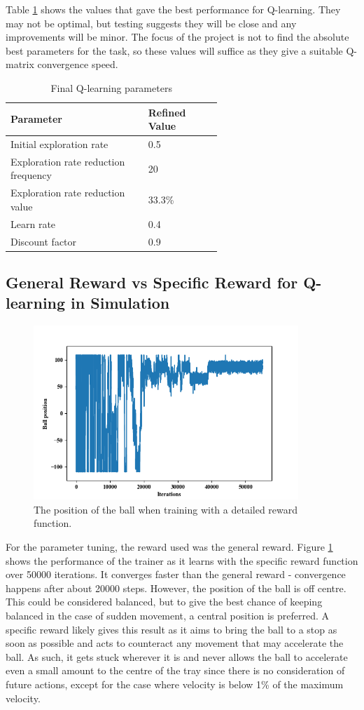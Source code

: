 \documentclass[12pt,a4paper]{article}
\begin{document}
Table \ref{q_params} shows the values that gave the best performance for Q-learning. They may not be optimal, but testing suggests they will be close and any improvements will be minor. The focus of the project is not to find the absolute best parameters for the task, so these values will suffice as they give a suitable Q-matrix convergence speed.
\begin{table}[htb]
\centering
\caption{Final Q-learning parameters}

\label{q_params}
\begin{tabular}{>{\raggedright}p{0.4\linewidth}p{0.2\linewidth}}\hline
Parameter & Refined Value\\ \hline\hline
Initial exploration rate & 0.5\\ \hline
Exploration rate reduction frequency & 20\\ \hline
Exploration rate reduction value & 33.3\% \\\hline
Learn rate & 0.4 \\\hline
Discount factor & 0.9 \\\hline
\end{tabular}
\end{table}


\subsection{General Reward vs Specific Reward for Q-learning in Simulation}
\begin{figure}[H]
	\centering
	\includegraphics[width=10cm]{157}
	\caption{The position of the ball when training with a detailed reward function.}
	\label{f5}
\end{figure}
For the parameter tuning, the reward used was the general reward. Figure \ref{f5} shows the performance of the trainer as it learns with the specific reward function over 50000 iterations. It converges faster than the general reward - convergence happens after about 20000 steps. However, the position of the ball is off centre. This could be considered balanced, but to give the best chance of keeping balanced in the case of sudden movement, a central position is preferred. A specific reward likely gives this result as it aims to bring the ball to a stop as soon as possible and acts to counteract any movement that may accelerate the ball. As such, it gets stuck wherever it is and never allows the ball to accelerate even a small amount to the centre of the tray since there is no consideration of future actions, except for the case where velocity is below 1\% of the maximum velocity.
\end{document}
